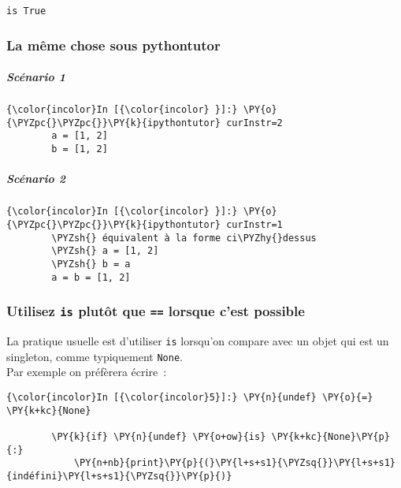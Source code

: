     \begin{Verbatim}[commandchars=\\\{\}]
is True

    \end{Verbatim}

    \hypertarget{la-muxeame-chose-sous-pythontutor}{%
\subsubsection{La même chose sous
pythontutor}\label{la-muxeame-chose-sous-pythontutor}}

    \hypertarget{scuxe9nario-1}{%
\subparagraph{Scénario 1}\label{scuxe9nario-1}}

    \begin{Verbatim}[commandchars=\\\{\}]
{\color{incolor}In [{\color{incolor} }]:} \PY{o}{\PYZpc{}\PYZpc{}}\PY{k}{ipythontutor} curInstr=2
        a = [1, 2]
        b = [1, 2]
\end{Verbatim}


    \hypertarget{scuxe9nario-2}{%
\subparagraph{Scénario 2}\label{scuxe9nario-2}}

    \begin{Verbatim}[commandchars=\\\{\}]
{\color{incolor}In [{\color{incolor} }]:} \PY{o}{\PYZpc{}\PYZpc{}}\PY{k}{ipythontutor} curInstr=1
        \PYZsh{} équivalent à la forme ci\PYZhy{}dessus
        \PYZsh{} a = [1, 2]
        \PYZsh{} b = a
        a = b = [1, 2]
\end{Verbatim}


    \hypertarget{utilisez-is-plutuxf4t-que-lorsque-cest-possible}{%
\subsubsection{\texorpdfstring{Utilisez \texttt{is} plutôt que
\texttt{==} lorsque c'est
possible}{Utilisez is plutôt que == lorsque c'est possible}}\label{utilisez-is-plutuxf4t-que-lorsque-cest-possible}}

    La pratique usuelle est d'utiliser \texttt{is} lorsqu'on compare avec un
objet qui est un singleton, comme typiquement \texttt{None}.\\

    Par exemple on préfèrera écrire~:

    \begin{Verbatim}[commandchars=\\\{\}]
{\color{incolor}In [{\color{incolor}5}]:} \PY{n}{undef} \PY{o}{=} \PY{k+kc}{None}
        
        \PY{k}{if} \PY{n}{undef} \PY{o+ow}{is} \PY{k+kc}{None}\PY{p}{:}
            \PY{n+nb}{print}\PY{p}{(}\PY{l+s+s1}{\PYZsq{}}\PY{l+s+s1}{indéfini}\PY{l+s+s1}{\PYZsq{}}\PY{p}{)}
\end{Verbatim}


